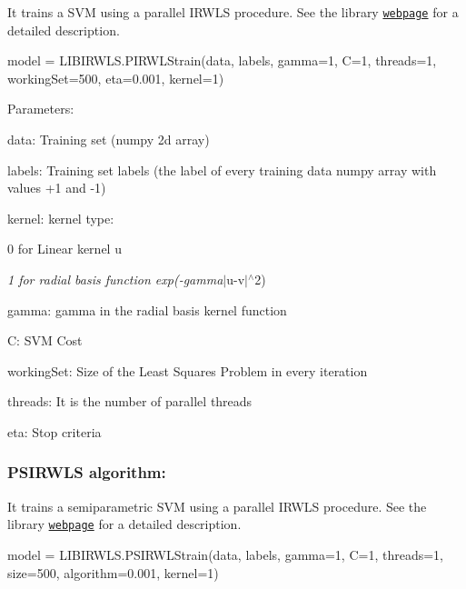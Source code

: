It trains a S\+VM using a parallel I\+R\+W\+LS procedure. See the library \href{https://robedm.github.io/LIBIRWLS/}{\tt webpage} for a detailed description.

\begin{DoxyVerb}model = LIBIRWLS.PIRWLStrain(data, labels, gamma=1, C=1, threads=1, workingSet=500, eta=0.001, kernel=1)
\end{DoxyVerb}


Parameters\+:
\begin{DoxyItemize}
\item data\+: Training set (numpy 2d array)
\item labels\+: Training set labels (the label of every training data numpy array with values +1 and -\/1)
\item kernel\+: kernel type\+:
\begin{DoxyItemize}
\item 0 for Linear kernel u
\item {\itshape 1 for radial basis function exp(-\/gamma}$\vert$u-\/v$\vert$$^\wedge$2)
\end{DoxyItemize}
\item gamma\+: gamma in the radial basis kernel function
\item C\+: S\+VM Cost
\item working\+Set\+: Size of the Least Squares Problem in every iteration
\item threads\+: It is the number of parallel threads
\item eta\+: Stop criteria
\end{DoxyItemize}

\subsubsection*{P\+S\+I\+R\+W\+LS algorithm\+:}

It trains a semiparametric S\+VM using a parallel I\+R\+W\+LS procedure. See the library \href{https://robedm.github.io/LIBIRWLS/}{\tt webpage} for a detailed description. \begin{DoxyVerb}    model = LIBIRWLS.PSIRWLStrain(data, labels, gamma=1, C=1, threads=1, size=500, algorithm=0.001, kernel=1)
\end{DoxyVerb}


